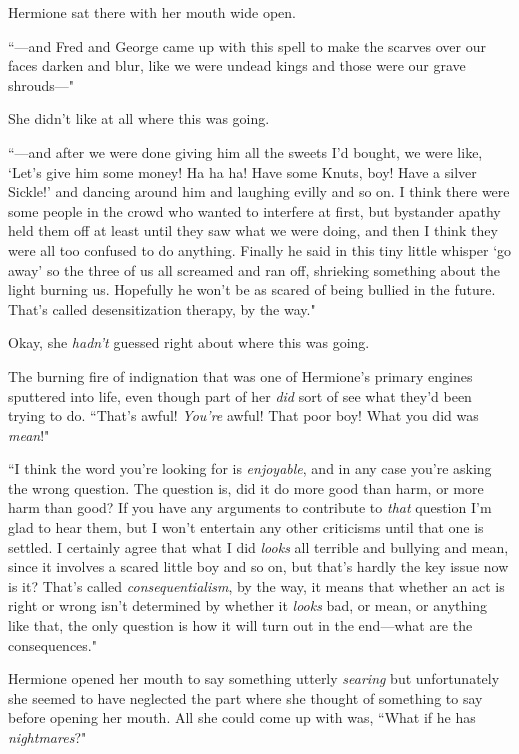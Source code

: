 Hermione sat there with her mouth wide open.

``—and Fred and George came up with this spell to make the scarves over our faces darken and blur, like we were undead kings and those were our grave shrouds—"

She didn't like at all where this was going.

``—and after we were done giving him all the sweets I'd bought, we were like, `Let's give him some money! Ha ha ha! Have some Knuts, boy! Have a silver Sickle!' and dancing around him and laughing evilly and so on. I think there were some people in the crowd who wanted to interfere at first, but bystander apathy held them off at least until they saw what we were doing, and then I think they were all too confused to do anything. Finally he said in this tiny little whisper `go away' so the three of us all screamed and ran off, shrieking something about the light burning us. Hopefully he won't be as scared of being bullied in the future. That's called desensitization therapy, by the way."

Okay, she \emph{hadn't} guessed right about where this was going.

The burning fire of indignation that was one of Hermione's primary engines sputtered into life, even though part of her \emph{did} sort of see what they'd been trying to do. ``That's awful! \emph{You're} awful! That poor boy! What you did was \emph{mean}!"

``I think the word you're looking for is \emph{enjoyable}, and in any case you're asking the wrong question. The question is, did it do more good than harm, or more harm than good? If you have any arguments to contribute to \emph{that} question I'm glad to hear them, but I won't entertain any other criticisms until that one is settled. I certainly agree that what I did \emph{looks} all terrible and bullying and mean, since it involves a scared little boy and so on, but that's hardly the key issue now is it? That's called \emph{consequentialism}, by the way, it means that whether an act is right or wrong isn't determined by whether it \emph{looks} bad, or mean, or anything like that, the only question is how it will turn out in the end—what are the consequences."

Hermione opened her mouth to say something utterly \emph{searing} but unfortunately she seemed to have neglected the part where she thought of something to say before opening her mouth. All she could come up with was, ``What if he has \emph{nightmares}?"

